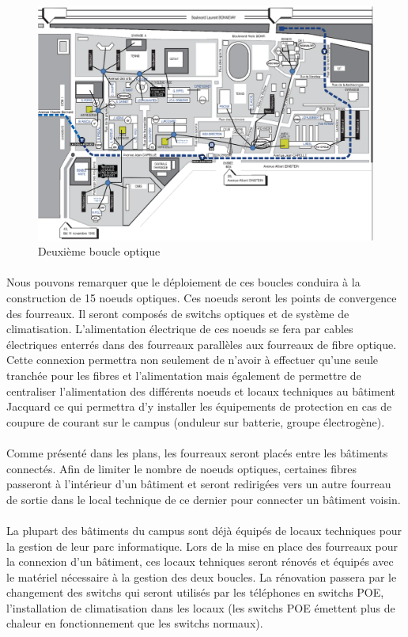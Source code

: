\begin{figure}[h]
  \caption{\label{Plan_boucle2} Deuxième boucle optique}
  \includegraphics[scale=0.7]{Boucle2.png}
\end{figure}
\newpage

\paragraph{} Nous pouvons remarquer que le déploiement de ces boucles conduira à la construction de 15 noeuds optiques. Ces noeuds seront les points de convergence des fourreaux. Il seront composés de switchs optiques et de système de climatisation. L'alimentation électrique de ces noeuds se fera par cables électriques enterrés dans des fourreaux parallèles aux fourreaux de fibre optique. Cette connexion permettra non seulement de n'avoir à effectuer qu'une seule tranchée pour les fibres et l'alimentation mais également de permettre de centraliser l'alimentation des différents noeuds et locaux techniques au bâtiment Jacquard ce qui permettra d'y installer les équipements de protection en cas de coupure de courant sur le campus (onduleur sur batterie, groupe électrogène).
\paragraph{} Comme présenté dans les plans, les fourreaux seront placés entre les bâtiments connectés. Afin de limiter le nombre de noeuds optiques, certaines fibres passeront à l'intérieur d'un bâtiment et seront redirigées vers un autre fourreau de sortie dans le local technique de ce dernier pour connecter un bâtiment voisin. 
\paragraph{} La plupart des bâtiments du campus sont déjà équipés de locaux techniques pour la gestion de leur parc informatique. Lors de la mise en place des fourreaux pour la connexion d'un bâtiment, ces locaux tehniques seront rénovés et équipés avec le matériel nécessaire à la gestion des deux boucles. La rénovation passera par le changement des switchs qui seront utilisés par les téléphones en switchs POE, l'installation de climatisation dans les locaux (les switchs POE émettent plus de chaleur en fonctionnement que les switchs normaux).

